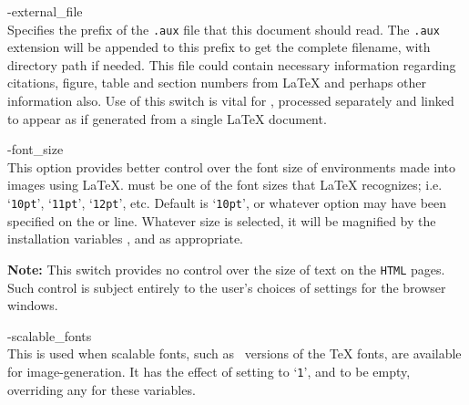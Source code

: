 \begin{htmllist}
%

\item [ -external\_file \Meta{filename}\label{cs_externalfile}] 
\\
Specifies the prefix of the \texttt{.aux} file that this document should read.
The \texttt{.aux} extension will be appended to this prefix 
to get the complete filename, with directory path if needed.\html{\\}  
This file could contain necessary information 
regarding citations, figure, table and section numbers from \LaTeX{} 
and perhaps other information also.
Use of this switch is vital for , 
processed separately and linked to appear as if generated 
from a single \LaTeX{} document.%

%
%

\item [ -font\_size \Meta{size}\label{cs_fontsize}]
\\
This option provides better control 
over the font size of environments made into images using \LaTeX.  
 must be one of the font sizes that \LaTeX{} recognizes; 
i.e. `\texttt{10pt}', `\texttt{11pt}', `\texttt{12pt}', etc.  
Default is `\texttt{10pt}', or whatever option may have been specified on the 
 or  line.\html{\\}
Whatever size is selected, it will be magnified by the installation variables
, 
and  as appropriate.

\smallskip\noindent
\textbf{Note: }This switch provides no control over the size of text
on the \texttt{HTML} pages. 
Such control is subject entirely to the user's choices
of settings for the browser windows.

%

\item [ -scalable\_fonts\label{cs_scalefonts}]
\\
This is used when scalable fonts, such as \PS\ versions
of the \TeX{} fonts, are available for image-generation.\html{\\}
It has the effect of setting  to `\texttt{1}',
and  to be empty, 
overriding any  for these variables.


\end{htmllist}
